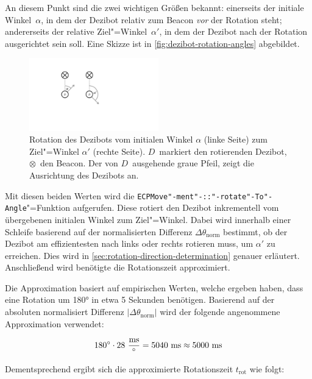 An diesem Punkt sind die zwei wichtigen Größen bekannt: einerseits der initiale Winkel~$\alpha$, in dem der Dezibot relativ zum Beacon \emph{vor} der Rotation steht; andererseits der relative Ziel"=Winkel~$\alpha'$, in dem der Dezibot nach der Rotation ausgerichtet sein soll. Eine Skizze ist in \autoref{fig:dezibot-rotation-angles} abgebildet.

\begin{figure}[h]
    \centering
    \includegraphics[width=0.5\textwidth]{../assets/dezibot_rotation_angles.pdf}
    \caption{Rotation des Dezibots vom initialen Winkel $\alpha$ (linke Seite) zum Ziel"=Winkel $\alpha'$ (rechte Seite). $D$~markiert den rotierenden Dezibot, $\otimes$~den Beacon. Der von $D$~ausgehende graue Pfeil, zeigt die Ausrichtung des Dezibots an.}
    \label{fig:dezibot-rotation-angles}
\end{figure}

Mit diesen beiden Werten wird die \texttt{ECPMove"-ment"-::"-rotate"-To"-Angle}"=Funktion aufgerufen. Diese rotiert den Dezibot inkrementell vom übergebenen initialen Winkel zum Ziel"=Winkel. Dabei wird innerhalb einer Schleife basierend auf der normalisierten Differenz $\Delta\theta_{\text{norm}}$ bestimmt, ob der Dezibot am effizientesten nach links oder rechts rotieren muss, um $\alpha'$ zu erreichen. Dies wird in \autoref{sec:rotation-direction-determination} genauer erläutert. Anschließend wird benötigte die Rotationszeit approximiert.

Die Approximation basiert auf empirischen Werten, welche ergeben haben, dass eine Rotation um 180° in etwa 5 Sekunden benötigen. Basierend auf der absoluten normalisiert Differenz $\vert\Delta\theta_{\text{norm}}\vert$ wird der folgende angenommene Approximation verwendet:

\begin{equation*}
    180^\circ \cdot 28~\frac{\text{ms}}{^\circ} = 5040~\text{ms} \approx 5000~\text{ms}
\end{equation*}

Dementsprechend ergibt sich die approximierte Rotationszeit $t_{\text{rot}}$ wie folgt:

